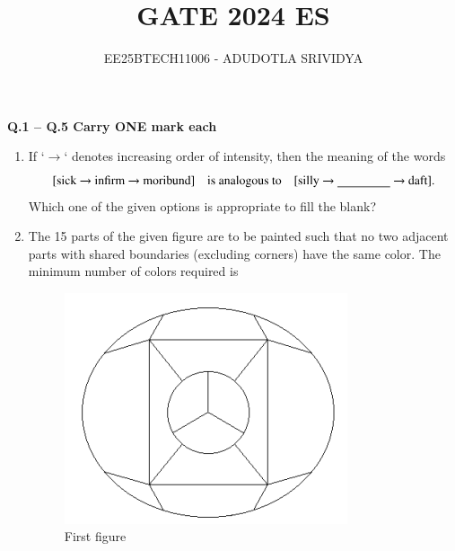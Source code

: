 \documentclass[journal]{IEEEtran}
\numberwithin{equation}{enumi}
\numberwithin{figure}{enumi}
\begin{document}

\vspace{3cm}

\title{GATE 2024 ES}
\author{EE25BTECH11006 - ADUDOTLA SRIVIDYA}
\maketitle
\noindent
\textbf{Q.1 -- Q.5 Carry ONE mark each}

\vspace{0.5cm}

\begin{enumerate}[start=1, label={Q\arabic*.}]

\item If `$\rightarrow$` denotes increasing order of intensity, then the meaning of the words
\[
\text{[sick $\rightarrow$ infirm $\rightarrow$ moribund]} \quad \text{is analogous to} \quad \text{[silly $\rightarrow$ \underline{\hspace{1.5cm}} $\rightarrow$ daft]}.
\]
Which one of the given options is appropriate to fill the blank?
\begin{enumerate} 
  \end{enumerate}
\item The 15 parts of the given figure are to be painted such that no two adjacent parts with shared boundaries (excluding corners) have the same color. The minimum number of colors required is
\begin{figure}[H]
    \centering
    \includegraphics[width=0.3\linewidth]{figs/fig1.png}
    \caption{First figure}
    \label{fig:first}
\end{figure}
\begin{enumerate} 
  \end{enumerate}
  

\end{enumerate}
\end{document}
